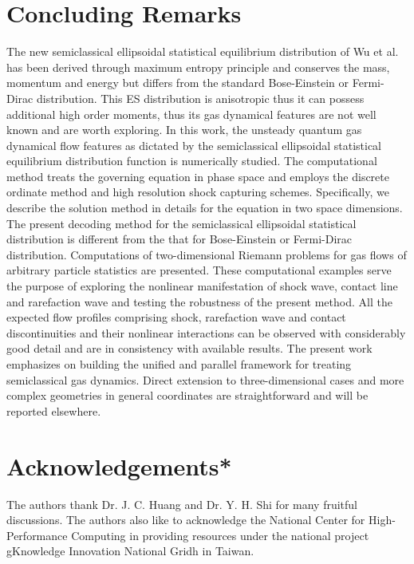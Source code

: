 \documentclass{rsproca}%
\begin{document}
\section{Concluding Remarks}
\label{remarks}
The new semiclassical ellipsoidal statistical equilibrium distribution of Wu et al. \cite{Wu2012} has been derived through maximum entropy principle and conserves the mass, momentum and energy but differs from the standard Bose-Einstein or Fermi-Dirac distribution.  This ES distribution is anisotropic thus it can possess additional high order moments, thus its gas dynamical features are not well known and are worth exploring.   In this work, the unsteady quantum gas dynamical flow features as dictated by the semiclassical ellipsoidal statistical equilibrium distribution function is numerically studied.   The computational method treats the governing equation in phase space and employs the discrete ordinate method and high resolution shock capturing schemes.  Specifically, we describe the solution method in details for the equation in two space dimensions.   The present decoding method for the semiclassical ellipsoidal statistical distribution is different from the that for Bose-Einstein or Fermi-Dirac distribution.   Computations of two-dimensional Riemann problems for gas flows of arbitrary particle statistics are presented.  These computational examples serve the purpose of exploring the nonlinear manifestation of shock wave, contact line and rarefaction wave and testing the robustness of the present method.   All the expected flow profiles comprising shock, rarefaction wave and contact discontinuities and their nonlinear interactions can be observed with considerably good detail and are in consistency with available results.   The present work emphasizes on building the unified and parallel framework for treating semiclassical gas dynamics.   Direct extension to three-dimensional cases and more complex geometries in general coordinates are straightforward and will be reported elsewhere.


\section{Acknowledgements*}
\label{Acknowledgements}
The authors thank Dr. J. C. Huang and Dr. Y. H. Shi for many fruitful discussions. The authors also like to acknowledge the National
Center for High-Performance Computing in providing resources
under the national project gKnowledge Innovation National Gridh in Taiwan.
\end{document}

